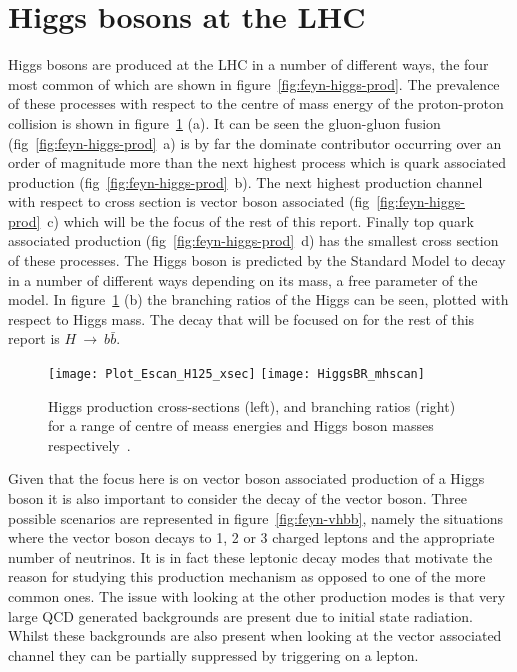 %

\section{Higgs bosons at the LHC}
%
Higgs bosons are produced at the LHC in a number of different ways, the four
most common of which are shown in figure~\ref{fig:feyn-higgs-prod}.
 The prevalence of these processes with
respect to the centre of mass energy of the proton-proton collision is shown in
figure~\ref{fig:higgs-br} (a). It can be seen the gluon-gluon fusion
(fig~\ref{fig:feyn-higgs-prod}~a) is by far the dominate contributor occurring
over an order of magnitude more than the next highest process which is quark
associated production (fig~\ref{fig:feyn-higgs-prod}~b). The next highest
production channel with respect to cross section is vector boson associated
(fig~\ref{fig:feyn-higgs-prod}~c) which will be the focus of the rest of this
report. Finally top quark associated production
(fig~\ref{fig:feyn-higgs-prod}~d) has the smallest cross section of these
processes.  The Higgs boson is predicted by the Standard Model to decay in a
number of different ways depending on its mass, a free parameter of the model.
In figure~\ref{fig:higgs-br} (b) the branching ratios of the Higgs can be seen,
plotted with respect to Higgs mass. The decay that will be focused on for the
rest of this report is $H~\rightarrow~b\bar{b}$.
\begin{figure}[h]
  \centering
  \texttt{[image: Plot\_Escan\_H125\_xsec]}%
  \texttt{[image: HiggsBR\_mhscan]}

  \caption{Higgs production cross-sections (left), and branching
    ratios (right) for a range of centre of meass energies and Higgs boson
    masses respectively~\cite{CERN-yellow-4}.}%
  \label{fig:higgs-br}
\end{figure}%
Given that the focus here is on vector boson associated production of a Higgs
boson it is also important to consider the decay of the vector boson. Three
possible scenarios are represented in figure~\ref{fig:feyn-vhbb}, namely the
situations where the vector boson decays to 1, 2 or 3 charged leptons and the
appropriate number of neutrinos.  It is in fact
these leptonic decay modes that motivate the reason for studying this production
mechanism as opposed to one of the more common ones. The issue with looking at
the other production modes is that very large QCD generated backgrounds are
present due to initial state radiation. Whilst these backgrounds are also
present when looking at the vector associated channel they can be partially
suppressed by triggering on a lepton.

